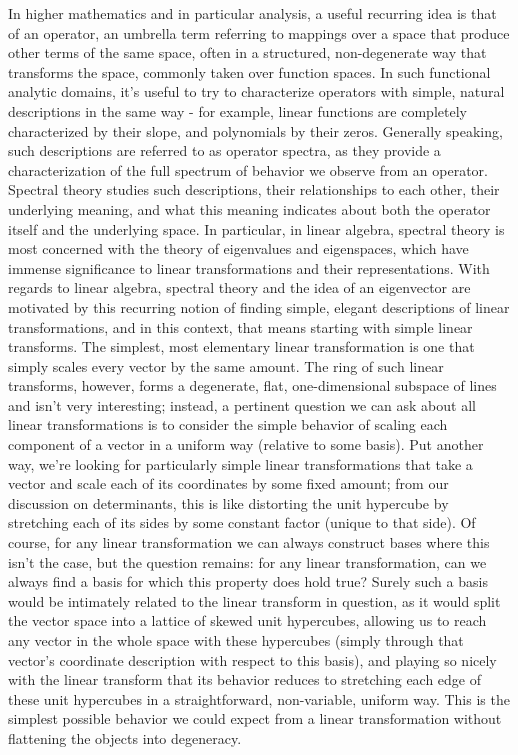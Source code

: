 \documentclass{article}
\newcommand{\nn}{\leavevmode \newline \newline}
\begin{document}
In higher mathematics and in particular analysis, a useful recurring idea is that of an operator, an umbrella term referring to mappings over a space that produce other terms of the same space, often in a structured, non-degenerate way that transforms the space, commonly taken over function spaces. In such functional analytic domains, it's useful to try to characterize operators with simple, natural descriptions in the same way - for example, linear functions are completely characterized by their slope, and polynomials by their zeros. Generally speaking, such descriptions are referred to as operator spectra, as they provide a characterization of the full spectrum of behavior we observe from an operator. Spectral theory studies such descriptions, their relationships to each other, their underlying meaning, and what this meaning indicates about both the operator itself and the underlying space. In particular, in linear algebra, spectral theory is most concerned with the theory of eigenvalues and eigenspaces, which have immense significance to linear transformations and their representations.
\nn
With regards to linear algebra, spectral theory and the idea of an eigenvector are motivated by this recurring notion of finding simple, elegant descriptions of linear transformations, and in this context, that means starting with simple linear transforms. The simplest, most elementary linear transformation is one that simply scales every vector by the same amount. The ring of such linear transforms, however, forms a degenerate, flat, one-dimensional subspace of lines and isn't very interesting; instead, a pertinent question we can ask about all linear transformations is to consider the simple behavior of scaling each component of a vector in a uniform way (relative to some basis). Put another way, we're looking for particularly simple linear transformations that take a vector and scale each of its coordinates by some fixed amount; from our discussion on determinants, this is like distorting the unit hypercube by stretching each of its sides by some constant factor (unique to that side). Of course, for any linear transformation we can always construct bases where this isn't the case, but the question remains: for any linear transformation, can we always find a basis for which this property does hold true? Surely such a basis would be intimately related to the linear transform in question, as it would split the vector space into a lattice of skewed unit hypercubes, allowing us to reach any vector in the whole space with these hypercubes (simply through that vector's coordinate description with respect to this basis), and playing so nicely with the linear transform that its behavior reduces to stretching each edge of these unit hypercubes in a straightforward, non-variable, uniform way. This is the simplest possible behavior we could expect from a linear transformation without flattening the objects into degeneracy.
\end{document}
